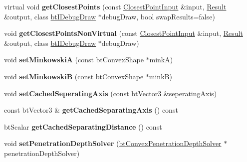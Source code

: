 \begin{DoxyCompactItemize}
\item 
\mbox{\label{classbtGjkPairDetector_a379db82ceb07eec40cded73527158305}} 
virtual void {\bfseries get\+Closest\+Points} (const \hyperlink{structbtDiscreteCollisionDetectorInterface_1_1ClosestPointInput}{Closest\+Point\+Input} \&input, \hyperlink{structbtDiscreteCollisionDetectorInterface_1_1Result}{Result} \&output, class \hyperlink{classbtIDebugDraw}{bt\+I\+Debug\+Draw} $\ast$debug\+Draw, bool swap\+Results=false)
\item 
\mbox{\label{classbtGjkPairDetector_abc29953dd7aee59e9ca887963c26c8c2}} 
void {\bfseries get\+Closest\+Points\+Non\+Virtual} (const \hyperlink{structbtDiscreteCollisionDetectorInterface_1_1ClosestPointInput}{Closest\+Point\+Input} \&input, \hyperlink{structbtDiscreteCollisionDetectorInterface_1_1Result}{Result} \&output, class \hyperlink{classbtIDebugDraw}{bt\+I\+Debug\+Draw} $\ast$debug\+Draw)
\item 
\mbox{\label{classbtGjkPairDetector_aa1c126f716f8c80f355ad48a5234ca73}} 
void {\bfseries set\+MinkowskiA} (const bt\+Convex\+Shape $\ast$minkA)
\item 
\mbox{\label{classbtGjkPairDetector_aee8fc2c182e482574ba9e819eea7b23a}} 
void {\bfseries set\+MinkowskiB} (const bt\+Convex\+Shape $\ast$minkB)
\item 
\mbox{\label{classbtGjkPairDetector_ab7fa662834f692ae7ee3c08cc1f23cd0}} 
void {\bfseries set\+Cached\+Seperating\+Axis} (const bt\+Vector3 \&seperating\+Axis)
\item 
\mbox{\label{classbtGjkPairDetector_aa90041d8e75db3d580c93b1b60cfb101}} 
const bt\+Vector3 \& {\bfseries get\+Cached\+Separating\+Axis} () const
\item 
\mbox{\label{classbtGjkPairDetector_a42b0eac142de4c92cb541932533a13ee}} 
bt\+Scalar {\bfseries get\+Cached\+Separating\+Distance} () const
\item 
\mbox{\label{classbtGjkPairDetector_a253d7d36f6ca288e41305682814c8c60}} 
void {\bfseries set\+Penetration\+Depth\+Solver} (\hyperlink{classbtConvexPenetrationDepthSolver}{bt\+Convex\+Penetration\+Depth\+Solver} $\ast$penetration\+Depth\+Solver)

\end{DoxyCompactItemize}

